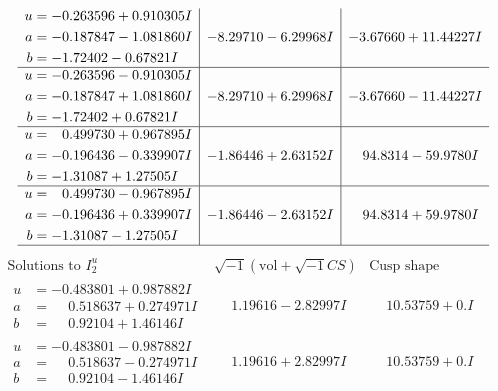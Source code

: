 \documentclass[1p]{elsarticle_modified}
\theoremstyle{definition}
\newcommand{\I}{\sqrt{-1}}
\begin{document}
$$\begin{array}{c|c|c}
\begin{aligned}
u &= -0.263596 + 0.910305 I \\
a &= -0.187847 - 1.081860 I \\
b &= -1.72402 - 0.67821 I\end{aligned}
 & -8.29710 - 6.29968 I & -3.67660 + 11.44227 I \\ \hline\begin{aligned}
u &= -0.263596 - 0.910305 I \\
a &= -0.187847 + 1.081860 I \\
b &= -1.72402 + 0.67821 I\end{aligned}
 & -8.29710 + 6.29968 I & -3.67660 - 11.44227 I \\ \hline\begin{aligned}
u &= \phantom{-}0.499730 + 0.967895 I \\
a &= -0.196436 - 0.339907 I \\
b &= -1.31087 + 1.27505 I\end{aligned}
 & -1.86446 + 2.63152 I & \phantom{-}94.8314 - 59.9780 I \\ \hline\begin{aligned}
u &= \phantom{-}0.499730 - 0.967895 I \\
a &= -0.196436 + 0.339907 I \\
b &= -1.31087 - 1.27505 I\end{aligned}
 & -1.86446 - 2.63152 I & \phantom{-}94.8314 + 59.9780 I\\
 \hline 
 \end{array}$$\newpage$$\begin{array}{c|c|c}  
\text{Solutions to }I^u_{2}& \I (\text{vol} + \sqrt{-1}CS) & \text{Cusp shape}\\
 \hline 
\begin{aligned}
u &= -0.483801 + 0.987882 I \\
a &= \phantom{-}0.518637 + 0.274971 I \\
b &= \phantom{-}0.92104 + 1.46146 I\end{aligned}
 & \phantom{-}1.19616 - 2.82997 I & \phantom{-}10.53759 + 0. I\phantom{ +0.000000I} \\ \hline\begin{aligned}
u &= -0.483801 - 0.987882 I \\
a &= \phantom{-}0.518637 - 0.274971 I \\
b &= \phantom{-}0.92104 - 1.46146 I\end{aligned}
 & \phantom{-}1.19616 + 2.82997 I & \phantom{-}10.53759 + 0. I\phantom{ +0.000000I} \\ \hline\begin{aligned}

\end{aligned}
\end{array}$$
\end{document}
